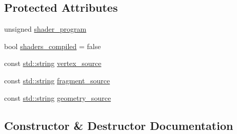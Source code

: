 \subsection*{Protected Attributes}
\begin{DoxyCompactItemize}
\item 
unsigned \mbox{\hyperlink{classShader_3_01RENDER__TYPE_1_1CUSTOM_01_4_a5baec51d258afd0d116d82cace52eace}{shader\+\_\+program}}
\item 
bool \mbox{\hyperlink{classShader_3_01RENDER__TYPE_1_1CUSTOM_01_4_a80cb5fdd63c57881cdf2b2dbb18e215e}{shaders\+\_\+compiled}} = false
\item 
const \mbox{\hyperlink{glad_8h_ac83513893df92266f79a515488701770}{std\+::string}} \mbox{\hyperlink{classShader_3_01RENDER__TYPE_1_1CUSTOM_01_4_ac6dfb0d85b637f3949777f047b1c010c}{vertex\+\_\+source}}
\item 
const \mbox{\hyperlink{glad_8h_ac83513893df92266f79a515488701770}{std\+::string}} \mbox{\hyperlink{classShader_3_01RENDER__TYPE_1_1CUSTOM_01_4_ac3319ff19c5af25e7d099fd2511066ea}{fragment\+\_\+source}}
\item 
const \mbox{\hyperlink{glad_8h_ac83513893df92266f79a515488701770}{std\+::string}} \mbox{\hyperlink{classShader_3_01RENDER__TYPE_1_1CUSTOM_01_4_acc41906788319945fc40ea589997112b}{geometry\+\_\+source}}
\end{DoxyCompactItemize}


\subsection{Constructor \& Destructor Documentation}
\mbox{\label{classShader_3_01RENDER__TYPE_1_1CUSTOM_01_4_a8238c3e1a3a96e7ed2b1777a340d7947}} 
